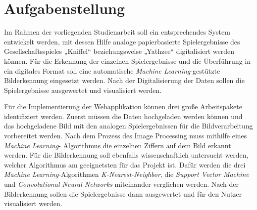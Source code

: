 \section{Aufgabenstellung}
Im Rahmen der vorliegenden Studienarbeit soll ein entsprechendes System entwickelt werden, mit dessen Hilfe analoge papierbasierte Spielergebnisse des
Gesellschaftsspieles „Kniffel“ beziehungsweise „Yathzee“ digitalisiert werden können. Für die Erkennung der einzelnen Spielergebnisse und die Überführung in ein digitales Format soll eine automatische \textit{Machine Learning}-gestützte Bilderkennung eingesetzt werden. Nach der Digitalisierung der Daten sollen die Spielergebnisse ausgewertet und visualisiert werden.

Für die Implementierung der Webapplikation können drei große Arbeitspakete identifiziert werden. Zuerst müssen die Daten hochgeladen werden können und das hochgeladene Bild mit den analogen Spielergebnissen für die Bildverarbeitung vorbereitet werden. Nach dem Prozess des Image Processing muss mithilfe eines \textit{Machine Learning}-
Algorithmus die einzelnen Ziffern auf dem Bild erkannt werden. Für die Bilderkennung soll ebenfalls wissenschaftlich untersucht werden, welcher Algorithmus am  geeignetsten für das Projekt ist. Dafür werden die drei \textit{Machine Learning}-Algorithmen \textit{K-Nearest-Neighbor}, die \textit{Support Vector Machine} und \textit{Convolutional Neural Networks} miteinander verglichen werden.
Nach der Bilderkennung sollen die Spielergebnisse dann ausgewertet und für den Nutzer visualisiert werden.

